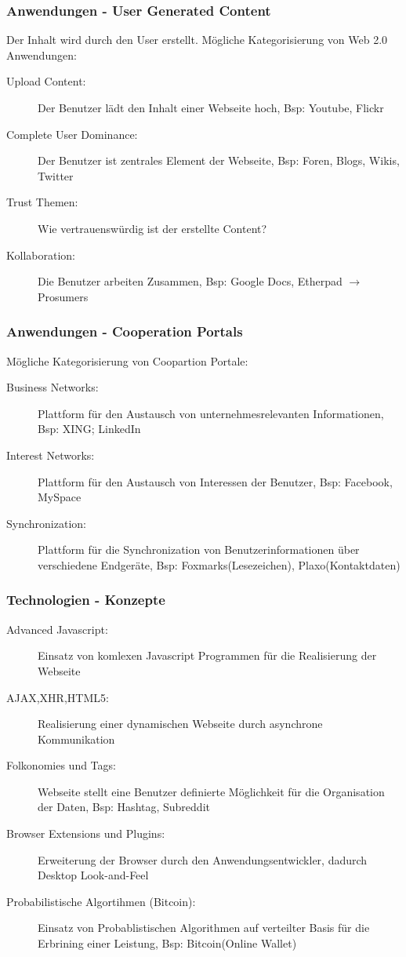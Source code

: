 \documentclass{article} %
\begin{document}
	\subsubsection{Anwendungen - User Generated Content}
	Der Inhalt wird durch den User erstellt. Mögliche Kategorisierung von Web 2.0 Anwendungen:
		\begin{description}
			\item [Upload Content:] Der Benutzer lädt den Inhalt einer Webseite hoch, Bsp: Youtube, Flickr
			\item [Complete User Dominance:] Der Benutzer ist zentrales Element der Webseite, Bsp: Foren, Blogs, Wikis, Twitter
			\item [Trust Themen:] Wie vertrauenswürdig ist der erstellte Content? 
			\item [Kollaboration:] Die Benutzer arbeiten Zusammen, Bsp: Google Docs, Etherpad $\rightarrow$ Prosumers
		\end{description}
	\subsubsection{Anwendungen - Cooperation Portals}
	 Mögliche Kategorisierung von Coopartion Portale:
		\begin{description}
			\item[Business Networks:] Plattform für den Austausch von unternehmesrelevanten Informationen, Bsp: XING; LinkedIn
			\item[Interest Networks:] Plattform für den Austausch von Interessen der Benutzer, Bsp: Facebook, MySpace
			\item[Synchronization:] Plattform für die Synchronization von Benutzerinformationen über verschiedene Endgeräte, Bsp: Foxmarks(Lesezeichen), Plaxo(Kontaktdaten)
		\end{description}
	\subsubsection{Technologien - Konzepte}
	\begin{description}
		\item[Advanced Javascript:] Einsatz von komlexen Javascript Programmen für die Realisierung der Webseite
		\item[AJAX,XHR,HTML5:]  Realisierung einer dynamischen Webseite durch asynchrone Kommunikation
		\item[Folkonomies und Tags:] Webseite stellt eine Benutzer definierte Möglichkeit für die Organisation der Daten, Bsp: Hashtag, Subreddit
		\item[Browser Extensions und Plugins:] Erweiterung der Browser durch den Anwendungsentwickler, dadurch Desktop Look-and-Feel
		\item[Probabilistische Algortihmen (Bitcoin):] Einsatz von Probablistischen Algorithmen auf verteilter Basis für die Erbrining einer Leistung, Bsp: Bitcoin(Online Wallet)
	\end{description}	
\end{document}
